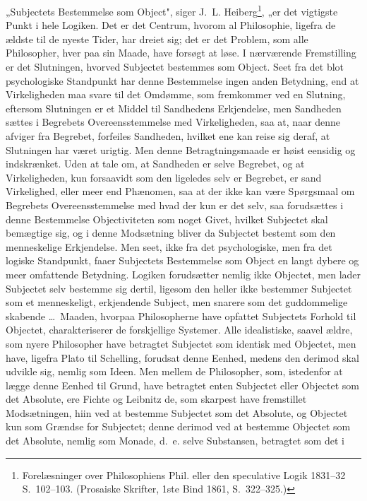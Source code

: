 \documentclass[12pt]{book}
\newcommand{\opage}[1]{\marginnote{\footnotesize\textit{[#1]}}}
\begin{document}
\opage{37} „Subjectets Bestemmelse som Object", siger J.~L. Heiberg\footnote{Forelæsninger
over Philosophiens Phil. eller den speculative Logik 1831--32 S.~102--103.
(Prosaiske Skrifter, 1ste Bind 1861, S.~322--325.)}, „er det vigtigste Punkt i
hele Logiken. Det er det Centrum, hvorom al Philosophie, ligefra de ældste til
de nyeste Tider, har dreiet sig; det er det Problem, som alle Philosopher, hver
paa sin Maade, have forsøgt at løse. I nærværende Fremstilling er det
Slutningen, hvorved Subjectet bestemmes som Object. Seet fra det blot
psychologiske Standpunkt har denne Bestemmelse ingen anden Betydning, end at
Virkeligheden maa svare til det Omdømme, som fremkommer ved en Slutning,
eftersom Slutningen er et Middel til Sandhedens Erkjendelse, men Sandheden
sættes i Begrebets Overeensstemmelse med Virkeligheden, saa at, naar denne
afviger fra Begrebet, forfeiles Sandheden, hvilket ene kan reise sig deraf, at
Slutningen har været urigtig. Men denne Betragtningsmaade er høist eensidig og
indskrænket. Uden at tale om, at Sandheden er selve Begrebet, og at
Virkeligheden, kun forsaavidt som den ligeledes selv er Begrebet, er sand
Virkelighed, eller meer end Phænomen, saa at der ikke kan være Spørgsmaal om
Begrebets Overeensstemmelse med hvad der kun er det selv, saa forudsættes i
denne Bestemmelse Objectiviteten som noget Givet, hvilket Subjectet skal
bemægtige sig, og i denne Modsætning bliver da Subjectet bestemt som den
menneskelige Erkjendelse. Men seet, ikke fra det psychologiske, men fra det
logiske Standpunkt, faaer Subjectets Bestemmelse som Object en langt dybere og
meer omfattende Betydning. Logiken forudsætter nemlig ikke Objectet, men lader
Subjectet selv bestemme sig dertil, ligesom den heller ikke bestemmer Subjectet
som et menneskeligt, erkjendende Subject, men snarere som det guddommelige
skabende \dots\ Maaden, hvorpaa Philosopherne have opfattet Subjectets Forhold
til Objectet, charakteriserer de forskjellige Systemer. Alle idealistiske,
saavel ældre, som
\opage{38} nyere Philosopher have betragtet Subjectet som identisk med Objectet, men have,
ligefra Plato til Schelling, forudsat denne Eenhed, medens den derimod skal
udvikle sig, nemlig som Ideen. Men mellem de Philosopher, som, istedenfor at
lægge denne Eenhed til Grund, have betragtet enten Subjectet eller Objectet som
det Absolute, ere Fichte og Leibnitz de, som skarpest have fremstillet
Modsætningen, hiin ved at bestemme Subjectet som det Absolute, og Objectet kun
som Grændse for Subjectet; denne derimod ved at bestemme Objectet som det
Absolute, nemlig som Monade, d.~e. selve Substansen, betragtet som det i
\end{document}

